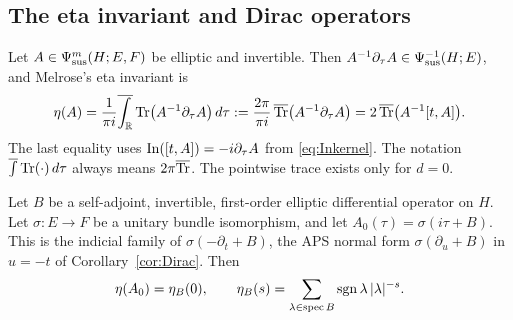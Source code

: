 \subsection{The eta invariant and Dirac operators}\label{tr:subsec:eta}

\begin{definition}\label{tr:def:eta}
Let \(A\in\Psi_{\mathrm{sus}}^m(H;E,F)\) be elliptic and invertible. Then
\(A^{-1}\partial_\tau A\in\Psi_{\mathrm{sus}}^{-1}(H;E)\), and Melrose's eta invariant
\cite{MelroseEta} is
\[
 \eta(A)=\frac1{\pi i}\overline{\int_\mathbb R}\operatorname{Tr}\bigl(A^{-1}\partial_\tau A
 \bigr)\,d\tau:=\frac{2\pi}{\pi i}\,\overline{\operatorname{Tr}}\bigl(A^{-1}\partial_\tau A\bigr)
 =2\,\overline{\operatorname{Tr}}\bigl(A^{-1}[t,A]\bigr).
\]
The last equality uses \(\operatorname{In}([t,A])=-i\partial_\tau A\) from
\eqref{eq:Inkernel}. The notation \(\overline{\int}\operatorname{Tr}(\cdot)\,d\tau\) always
means \(2\pi\overline{\operatorname{Tr}}\). The pointwise trace exists only for \(d=0\).
\end{definition}

\begin{theorem}\label{tr:thm:Dirac}
Let \(B\) be a self-adjoint, invertible, first-order elliptic differential
operator on \(H\). Let \(\sigma:E\to F\) be a unitary bundle isomorphism,
and let \(A_0(\tau)=\sigma(i\tau+B)\). This is the indicial family of
\(\sigma(-\partial_t+B)\), the APS normal form \(\sigma(\partial_u+B)\) in
\(u=-t\) of Corollary~\ref{cor:Dirac}. Then
\[
 \eta(A_0)=\eta_B(0),\qquad\eta_B(s)=\sum_{\lambda\in\operatorname{spec}B}
 \operatorname{sgn}\lambda\,|\lambda|^{-s}.
\]
\end{theorem}

